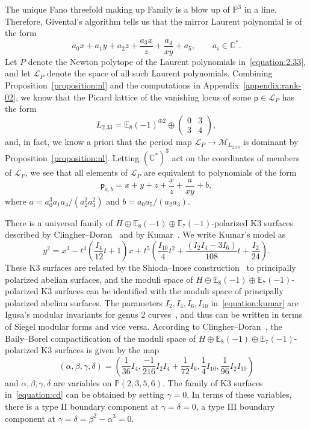 \documentclass[10pt]{amsart}
\numberwithin{equation}{section}
\theoremstyle{plain}
\theoremstyle{definition}
\theoremstyle{remark}
\begin{document}
The unique Fano threefold making up Family  is a blow up of \(\mathbb{P}^3\) in a line. Therefore, Givental's algorithm tells us that the mirror Laurent polynomial is of the form
\begin{equation}\label{equation:2.33}
  a_0x + a_1y+ a_2z + \dfrac{a_3x}{z} + \dfrac{a_4}{xy} + a_5,\qquad a_i \in \mathbb{C}^*.
\end{equation}
Let \(P\) denote the Newton polytope of the Laurent polynomials in~\eqref{equation:2.33}, and let \(\mathcal{L}_P\) denote the space of all such Laurent polynomials. Combining Proposition~\ref{proposition:nl} and the computations in Appendix~\ref{appendix:rank-02}, we know that the Picard lattice of the vanishing locus of some \(\mathsf{p} \in \mathcal{L}_P\) has the form
\[
  L_{2.33} = \mathbb{E}_8(-1)^{\oplus 2}\oplus \left(\begin{matrix} 0 & 3 \\ 3 & 4 \end{matrix} \right),
\]
and, in fact, we know a priori that the period map \(\mathcal{L}_P\rightarrow \mathcal{M}_{L_{2.33}}\) is dominant by Proposition~\ref{proposition:nl}. Letting \((\mathbb{C}^*)^3\) act on the coordinates of members of \(\mathcal{L}_P\), we see that all elements of \(\mathcal{L}_P\) are equivalent to polynomials of the form
\[
  \mathsf{p}_{a,b} = x + y+ z + \dfrac{x}{z} + \dfrac{a}{xy} + b,
\]
where \(a = a_0^3a_1a_4/(a_2^2 a_3^2)\) and \(b = a_0a_5/(a_2a_3)\).

There is a universal family of \(H \oplus \mathbb{E}_8(-1)\oplus \mathbb{E}_7(-1)\)-polarized K3 surfaces described by Clingher--Doran~\cite{clingher2012lattice} and by Kumar~\cite{kumar2008k3}. We write Kumar's model as
\begin{equation}\label{equation:kumar}
  y^2  = x^3 - t^3 \left(\dfrac{I_4}{12}t + 1 \right)x + t^{5}\left( \dfrac{I_{10}}{4}t^2 + \dfrac{(I_2I_4 - 3I_6)}{108}t + \dfrac{I_2}{24}\right).
\end{equation}
These K3 surfaces are related by the Shioda--Inose construction~\cite{morrison1984k3} to principally polarized abelian surfaces, and the moduli space of \(H \oplus \mathbb{E}_8(-1)\oplus \mathbb{E}_7(-1)\)-polarized K3 surfaces can be identified with the moduli space of principally polarized abelian surfaces. The parameters \(I_2,I_4, I_6, I_{10}\) in~\eqref{equation:kumar} are Igusa's modular invariants for genus 2 curves~\cite{igusa1960arithmetic}, and thus can be written in terms of Siegel modular forms and vice versa. According to Clingher--Doran~\cite{clingher2012lattice}, the Baily--Borel compactification of the moduli space of \(H \oplus \mathbb{E}_8(-1)\oplus \mathbb{E}_7(-1)\)-polarized K3 surfaces is given by the map
\[
  (\alpha,\beta,\gamma,\delta) = \left( \dfrac{1}{36} I_4, \dfrac{-1}{216} I_2I_4 + \dfrac{1}{72} I_6, \dfrac{1}{4} I_{10}, \dfrac{1}{96} I_2I_{10}\right)
\]
and \(\alpha,\beta,\gamma,\delta\) are variables on \(\mathbb{P}(2,3,5,6)\). The family of K3 surfaces in~\eqref{equation:cd} can be obtained by setting \(\gamma = 0\). In terms of these variables, there is a type II boundary component at \(\gamma=\delta=0\), a type III boundary component at \(\gamma=\delta=\beta^2-\alpha^3=0\).
\end{document}
